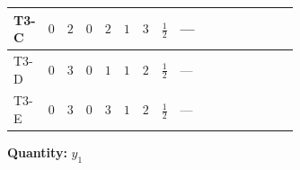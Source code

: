 \documentclass[8pt]{article}
\begin{document}
\begin{landscape}
\begin{longtable}{@{}llcccccc >{\raggedright\arraybackslash}p{0.21\linewidth} >{\raggedright\arraybackslash}p{0.21\linewidth} >{\raggedright\arraybackslash}p{0.21\linewidth}@{}}
\midrule
T3-C & $0$ & $2$ & $0$ & $2$ & $1$ & $3$ & $\frac{1}{2}$ & --- & \scriptsize\adjustbox{max width=\linewidth}{$\begin{gathered} -\frac{33}{4} {g_2}^2 \left({y_1}\right)_{ij}\end{gathered}$} & \scriptsize\adjustbox{max width=\linewidth}{$\begin{gathered} -\frac{3}{2} {g_1}^2 \left({y_1}\right)_{ij}\end{gathered}$} \\
\midrule
T3-D & $0$ & $3$ & $0$ & $1$ & $1$ & $2$ & $\frac{1}{2}$ & --- & \scriptsize\adjustbox{max width=\linewidth}{$\begin{gathered} -\frac{9}{2} {g_2}^2 \left({y_1}\right)_{ij}\end{gathered}$} & \scriptsize\adjustbox{max width=\linewidth}{$\begin{gathered} -\frac{3}{2} {g_1}^2 \left({y_1}\right)_{ij}\end{gathered}$} \\
\midrule
T3-E & $0$ & $3$ & $0$ & $3$ & $1$ & $2$ & $\frac{1}{2}$ & --- & \scriptsize\adjustbox{max width=\linewidth}{$\begin{gathered} -\frac{9}{2} {g_2}^2 \left({y_1}\right)_{ij}\end{gathered}$} & \scriptsize\adjustbox{max width=\linewidth}{$\begin{gathered} -\frac{3}{2} {g_1}^2 \left({y_1}\right)_{ij}\end{gathered}$} \\
\midrule
\bottomrule
\end{longtable}
\clearpage
\noindent\textbf{Quantity: }$y_1$\par\smallskip

\end{landscape}
\end{document}
